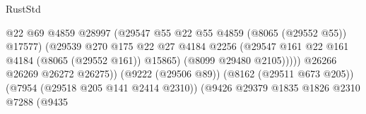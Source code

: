 \begin{lexlean}{RustStd}
\begin{coremodule}
                                                          @22
                                                          @69
                                                          @4859
                                                          @28997
                                                          (@29547
                                                            @55
                                                            @22
                                                            @55
                                                            @4859
                                                            (@8065 (@29552 @55))
                                                            @17577)
                                                          (@29539
                                                            @270
                                                            @175
                                                            @22
                                                            @27
                                                            @4184
                                                            @2256
                                                            (@29547
                                                              @161
                                                              @22
                                                              @161
                                                              @4184
                                                              (@8065 (@29552 @161))
                                                              @15865)
                                                            (@8099 @29480 @2105)))))
                                                    @26266
                                                    @26269
                                                    @26272
                                                    @26275))
                                                (@9222 (@29506 @89))
                                                (@8162 (@29511 @673 @205))
                                                (@7954 (@29518 @205 @141 @2414 @2310))
                                                (@9426
                                                  @29379
                                                  @1835
                                                  @1826
                                                  @2310
                                                  @7288
                                                  (@9435

\end{coremodule}
\end{lexlean}
